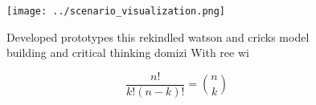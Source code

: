 \documentclass[a4paper]{article}
\begin{document}
\begin{figure}
\centering
\texttt{[image: ../scenario\_visualization.png]}
\caption{Developed prototypes this rekindled watson and cricks model building and critical thinking domizi With ree wi
}
\end{figure}
 
\[ \frac{n!}{k!(n-k)!} = \binom{n}{k} \]
\end{document}
